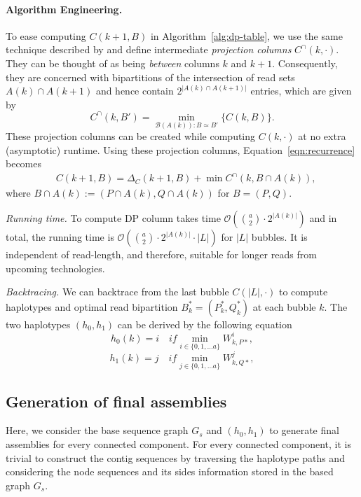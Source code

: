 \paragraph{Algorithm Engineering.}
To ease computing $C(k+1,B)$ in Algorithm~\ref{alg:dp-table}, we use the same technique described by \cite{} and define intermediate \emph{projection columns} $C^\cap(k,\cdot)$.
They can be thought of as being \emph{between} columns $k$ and $k+1$.
Consequently, they are concerned with bipartitions of the intersection of read sets $A(k)\cap A(k+1)$ and hence contain $2^{|A(k)\cap A(k+1)|}$ entries, which are given by
\begin{equation}\label{eqn:proj_col}
C^\cap(k,B')=\min_{\mathcal{B}(A(k)):B\simeq B'}\{C(k,B)\}.
\end{equation}
These projection columns can be created while computing $C(k,\cdot)$ at no extra (asymptotic) runtime.
Using these projection columns, Equation~\eqref{eqn:recurrence} becomes
\begin{align}\label{eqn:recurrence_projcol}
& C(k+1,B)= \Delta_C(k+1,B) + \min C^\cap(k,B\cap A(k)), \nonumber
\end{align}
where $B\cap A(k) := (P\cap A(k), Q\cap A(k))$ for $B=(P,Q)$.

\textit{Running time.} To compute DP column takes time $\mathcal{O}( {a \choose 2} \cdot 2^{|A(k)|})$ and in total, the running time is $\mathcal{O}( {a \choose 2} \cdot 2^{|A(k)|} \cdot |L|)$ for $|L|$ bubbles.
It is independent of read-length, and therefore, suitable for longer reads from upcoming technologies.

\textit{Backtracing.} We can backtrace from the last bubble $C(|L|, \cdot)$ to compute haplotypes and optimal read bipartition $B^*_k = (P^*_k, Q^*_k)$ at each bubble $k$.
The two haplotypes $(h_0, h_1)$ can be derived by the following equation
\begin{equation}\label{eqn:haplo_c1}
h_0(k)= i \quad if \min_{i\in \{0,1, \ldots a\}} W_{k,P*}^i, \nonumber
\end{equation}
\begin{equation}\label{eqn:haplo_c2}
h_1(k)= j \quad if \min_{j\in \{0,1, \ldots a\}} W_{k,Q*}^j, \nonumber
\end{equation}

\subsection{Generation of final assemblies}
Here, we consider the base sequence graph $G_s$ and $(h_0,h_1)$ to generate final assemblies for every connected component.
For every connected component, it is trivial to construct the contig sequences by traversing the haplotype paths and considering the node sequences and its sides information stored in the based graph $G_s$.

